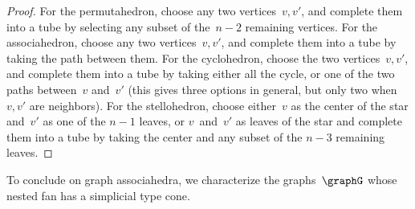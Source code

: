 \documentclass{amsart}
\theoremstyle{definition}
\newtheorem{example}[theorem]{Example}
\begin{document}
\begin{proof}
For the permutahedron, choose any two vertices~$v,v'$, and complete them into a tube by selecting any subset of the~$n-2$ remaining vertices.
For the associahedron, choose any two vertices~$v,v'$, and complete them into a tube by taking the path between them.
For the cyclohedron, choose the two vertices~$v,v'$, and complete them into a tube by taking either all the cycle, or one of the two paths between~$v$ and~$v'$ (this gives three options in general, but only two when~$v,v'$ are neighbors).
For the stellohedron, choose either~$v$ as the center of the star and~$v'$ as one of the $n-1$ leaves, or $v$~and~$v'$ as leaves of the star and complete them into a tube by taking the center and any subset of the $n-3$ remaining leaves.
\end{proof}


To conclude on graph associahedra, we characterize the graphs~$\graphG$ whose nested fan has a simplicial type cone.
\end{document}
